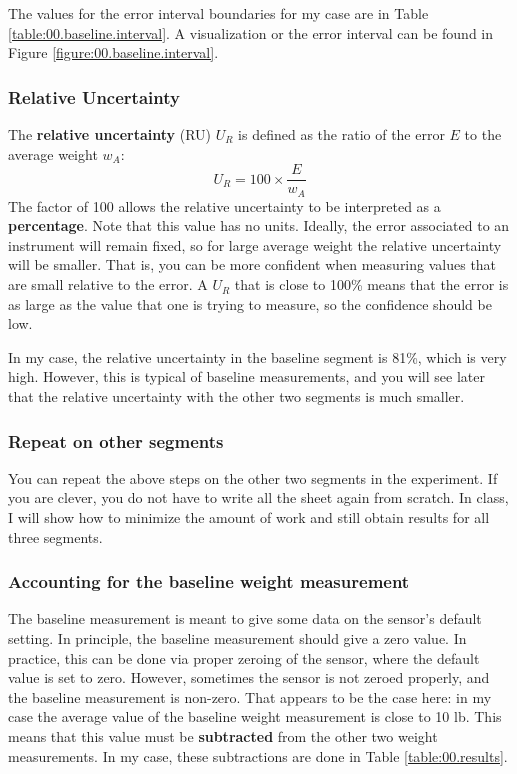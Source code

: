 The values for the error interval boundaries for my case are in Table \ref{table:00.baseline.interval}. A visualization or the error interval can be found in Figure \ref{figure:00.baseline.interval}.
%
\subsubsection{Relative Uncertainty}
%
The \textbf{relative uncertainty} (RU) $U_{R}$ is defined as the ratio of the error $E$ to the average weight $w_{A}$:
\begin{equation}
    U_{R} = 100 \times \frac{E}{w_{A}}
\end{equation}
The factor of 100 allows the relative uncertainty to be interpreted as a \textbf{percentage}. Note that this value has no units. Ideally, the error associated to an instrument will remain fixed, so for large average weight the relative uncertainty will be smaller. That is, you can be more confident when measuring values that are small relative to the error. A $U_{R}$ that is close to 100\% means that the error is as large as the value that one is trying to measure, so the confidence should be low.

In my case, the relative uncertainty in the baseline segment is 81\%, which is very high. However, this is typical of baseline measurements, and you will see later that the relative uncertainty with the other two segments is much smaller.
%
\subsubsection{Repeat on other segments}
%
You can repeat the above steps on the other two segments in the experiment. If you are clever, you do not have to write all the sheet again from scratch. In class, I will show how to minimize the amount of work and still obtain results for all three segments.
%
\subsubsection{Accounting for the baseline weight measurement}
%
The baseline measurement is meant to give some data on the sensor's default setting. In principle, the baseline measurement should give a zero value. In practice, this can be done via proper zeroing of the sensor, where the default value is set to zero. However, sometimes the sensor is not zeroed properly, and the baseline measurement is non-zero. That appears to be the case here: in my case the average value of the baseline weight measurement is close to 10 lb. This means that this value must be \textbf{subtracted} from the other two weight measurements. In my case, these subtractions are done in Table \ref{table:00.results}.
%
